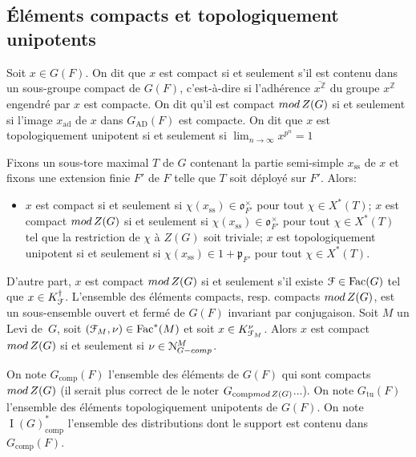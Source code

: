 \documentclass[11pt]{article}
\newcommand{\resp}{resp.\xspace}
\numberwithin{equation}{section}\providecommand{\og}{«\,}\providecommand{\fg}{\,»}
\let\mathcal \EuScript
\newcommand{\rmod}{\textup{mod}\,}
\newcommand{\fro}{\mathfrak{o}}
\newcommand{\frp}{\mathfrak{p}}
\newcommand{\AD}{\mathrm{AD}}
\newcommand{\comp}{\mathrm{comp}}
\newcommand{\tcomp}{\textup{-comp}}
\newcommand{\Fac}{\mathrm{Fac}}
\newcommand{\rss}{\mathrm{ss}}
\newcommand{\tu}{\mathrm{tu}}
\DeclareMathOperator{\ad}{ad}
\DeclareMathOperator{\rI}{I}
\newcommand{\cF}{\mathcal{F}}
\newcommand{\cN}{\mathcal{N}}
\newcommand{\ZZ}{\mathbb{Z}}
\theoremstyle{plain}
\theoremstyle{definition}
\begin{document}
\subsection{Éléments compacts et topologiquement unipotents}\label{elementscompacts}
Soit $x\in G(F)$. On dit que $x$ est compact si et seulement s'il est contenu dans un sous-groupe compact de $G(F)$, c'est-à-dire si l'adhérence $\overline{x^{\ZZ}}$ du groupe $x^{\ZZ}$ engendré par $x$ est compacte. On dit qu'il est compact $\rmod Z(G)$ si et seulement si l'image $x_{\ad}$ de $x$ dans $G_{\AD}(F)$ est compacte. On dit que $x$ est topologiquement unipotent si et seulement si $\lim_{n\to \infty}x^{p^n}=1$

Fixons un sous-tore maximal $T$ de $G$ contenant la partie semi-simple $x_{\rss}$ de $x$ et fixons une extension finie $F'$ de $F$ telle que $T$ soit déployé sur $F'$. Alors:
\begin{itemize}
\item
$x$ est compact si et seulement si $ \chi(x_{\rss})\in \fro^{\times}_{F'}$ pour tout $\chi\in X^*(T)$; $x$ est compact $\rmod Z(G)$ si et seulement si $ \chi(x_{\rss})\in \fro^{\times}_{F'}$ pour tout $\chi\in X^*(T)$ tel que la restriction de $\chi$ à $Z(G)$ soit triviale; $x$ est topologiquement unipotent si et seulement si $\chi(x_{\rss})\in 1+\frp_{F'}$ pour tout $\chi\in X^*(T)$.
\end{itemize}

D'autre part, $x$ est compact $\rmod Z(G)$ si et seulement s'il existe $\cF\in \Fac(G)$ tel que $x\in K_{\cF}^{\dag}$. L'ensemble des éléments compacts, \resp compacts $\rmod Z(G)$, est un sous-ensemble ouvert et fermé de $G(F)$ invariant par conjugaison. Soit $M$ un Levi de~$G$, soit $(\cF_{M},\nu)\in \Fac^*(M)$ et soit $x\in K_{\cF_{M}}^{\nu}$. Alors $x$ est compact $\rmod Z(G)$ si et seulement si $\nu\in \cN^M_{G\tcomp}$.

On note $G_{\comp}(F)$ l'ensemble des éléments de $G(F)$ qui sont compacts $\rmod Z(G)$ (il serait plus correct de le noter $G_{\comp\rmod Z(G)}$...). On note $G_{\tu}(F)$ l'ensemble des éléments topologiquement unipotents de $G(F)$. On note $\rI(G)^*_{\comp}$ l'ensemble des distributions dont le support est contenu dans $G_{\comp}(F)$.
\end{document}
